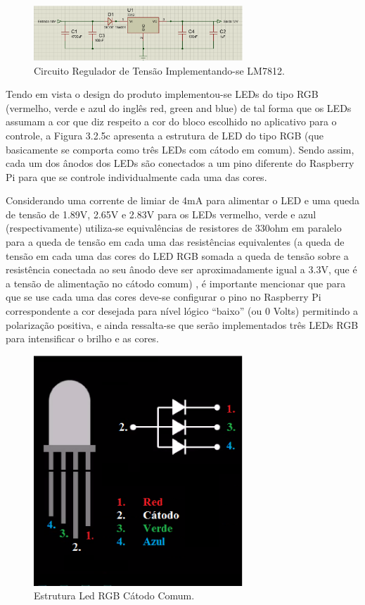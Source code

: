 \begin{figure}[H]
    \centering
    \includegraphics[width=0.7\textwidth]{figuras/regulador.eps}
    \caption{Circuito Regulador de Tensão Implementando-se LM7812.}
    \label{fig:regulador}
\end{figure}

Tendo em vista o design do produto implementou-se LEDs do tipo RGB (vermelho, verde e azul do inglês red, green and blue) de tal forma
que os LEDs assumam a cor que diz respeito a cor do bloco escolhido no aplicativo para o controle, a  Figura 3.2.5c apresenta a estrutura
de LED do tipo RGB (que basicamente se comporta como três LEDs com cátodo em comum). Sendo assim, cada um dos ânodos dos LEDs são
conectados a um pino diferente do Raspberry Pi para que se controle individualmente cada uma das cores.

Considerando uma corrente de limiar de 4mA para alimentar o LED e uma queda de tensão de 1.89V, 2.65V e 2.83V para os LEDs vermelho,
verde e azul (respectivamente) utiliza-se equivalências de resistores de 330ohm em paralelo para a queda de tensão em cada uma das resistências
equivalentes (a queda de tensão em cada uma das cores do LED RGB somada a queda de tensão sobre a resistência conectada ao seu ânodo deve
ser aproximadamente igual a 3.3V, que é a tensão de alimentação no cátodo comum) , é importante mencionar que para
que se use cada uma das cores deve-se configurar o pino no Raspberry Pi correspondente a cor desejada para nível lógico “baixo” (ou 0
Volts) permitindo a polarização positiva, e ainda ressalta-se que serão implementados três LEDs RGB para intensificar o brilho e as cores.

\begin{figure}[H]
    \centering
    \includegraphics[width=0.7\textwidth]{figuras/led.eps}
    \caption{Estrutura Led RGB Cátodo Comum.}
    \label{fig:led}
\end{figure}

